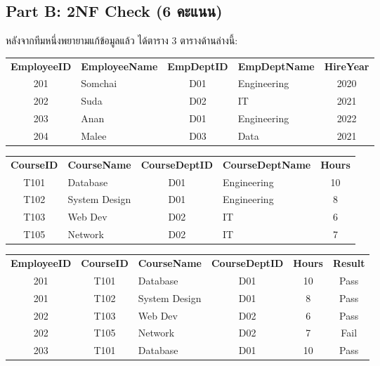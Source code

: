 \documentclass[a4paper,12pt]{article}
\begin{document}
\newpage
\subsection*{Part B: 2NF Check (6 คะแนน)}
หลังจากทีมหนึ่งพยายามแก้ข้อมูลแล้ว ได้ตาราง 3 ตารางด้านล่างนี้:

\begin{center}
\renewcommand{\arraystretch}{1.12}
\small
\begin{tabular}{|c|l|c|l|c|}
    \hline
    \rowcolor{gray!20}
    \multicolumn{5}{|c|}{\textbf{EMPLOYEE}} \\
    \hline
    \textbf{EmployeeID} & \textbf{EmployeeName} & \textbf{EmpDeptID} & \textbf{EmpDeptName} & \textbf{HireYear} \\
    \hline
    201 & Somchai & D01 & Engineering & 2020 \\
    202 & Suda & D02 & IT & 2021 \\
    203 & Anan & D01 & Engineering & 2022 \\
    204 & Malee & D03 & Data & 2021 \\
    \hline
\end{tabular}
\end{center}

\begin{center}
\renewcommand{\arraystretch}{1.12}
\small
\begin{tabular}{|c|l|c|l|c|}
    \hline
    \rowcolor{gray!20}
    \multicolumn{5}{|c|}{\textbf{COURSE}} \\
    \hline
    \textbf{CourseID} & \textbf{CourseName} & \textbf{CourseDeptID} & \textbf{CourseDeptName} & \textbf{Hours} \\
    \hline
    T101 & Database & D01 & Engineering & 10 \\
    T102 & System Design & D01 & Engineering & 8 \\
    T103 & Web Dev & D02 & IT & 6 \\
    T105 & Network & D02 & IT & 7 \\
    \hline
\end{tabular}
\end{center}

\begin{center}
\renewcommand{\arraystretch}{1.12}
\small
\begin{tabular}{|c|c|l|c|c|c|}
    \hline
    \rowcolor{gray!20}
    \multicolumn{6}{|c|}{\textbf{TRAINING}} \\
    \hline
    \textbf{EmployeeID} & \textbf{CourseID} & \textbf{CourseName} & \textbf{CourseDeptID} & \textbf{Hours} & \textbf{Result} \\
    \hline
    201 & T101 & Database & D01 & 10 & Pass \\
    201 & T102 & System Design & D01 & 8 & Pass \\
    202 & T103 & Web Dev & D02 & 6 & Pass \\
    202 & T105 & Network & D02 & 7 & Fail \\
    203 & T101 & Database & D01 & 10 & Pass \\
    \hline
\end{tabular}
\end{center}
\end{document}
